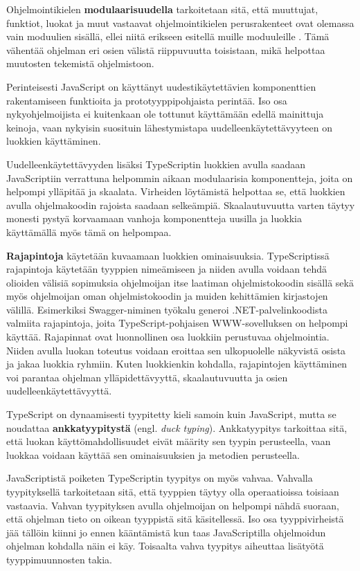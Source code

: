\documentclass[utf8]{gradu3}
\begin{document}
Ohjelmointikielen \textbf{modulaarisuudella} tarkoitetaan sitä, että muuttujat, funktiot, luokat ja muut vastaavat ohjelmointikielen perusrakenteet ovat olemassa vain moduulien sisällä, ellei niitä erikseen esitellä muille moduuleille \parencite[]{typescript-modules}. Tämä vähentää ohjelman eri osien välistä riippuvuutta toisistaan, mikä helpottaa muutosten tekemistä ohjelmistoon.

Perinteisesti JavaScript on käyttänyt uudestikäytettävien komponenttien rakentamiseen funktioita ja prototyyppipohjaista perintää. Iso osa nykyohjelmoijista ei kuitenkaan ole tottunut käyttämään edellä mainittuja keinoja, vaan nykyisin suosituin lähestymistapa uudelleenkäytettävyyteen on luokkien käyttäminen. \parencite[]{typescript-classes}

Uudelleenkäytettävyyden lisäksi TypeScriptin luokkien avulla saadaan JavaScriptiin verrattuna helpommin aikaan modulaarisia komponentteja, joita on helpompi ylläpitää ja skaalata. Virheiden löytämistä helpottaa se, että luokkien avulla ohjelmakoodin rajoista saadaan selkeämpiä. Skaalautuvuutta varten täytyy monesti pystyä korvaamaan vanhoja komponentteja uusilla ja luokkia käyttämällä myös tämä on helpompaa.

\textbf{Rajapintoja} käytetään kuvaamaan luokkien ominaisuuksia. TypeScriptissä rajapintoja käytetään tyyppien nimeämiseen ja niiden avulla voidaan tehdä olioiden välisiä sopimuksia ohjelmoijan itse laatiman ohjelmistokoodin sisällä sekä myös ohjelmoijan oman ohjelmistokoodin ja muiden kehittämien kirjastojen välillä. \parencite[]{typescript-interfaces} Esimerkiksi Swagger-niminen työkalu generoi .NET-palvelinkoodista valmiita rajapintoja, joita TypeScript-pohjaisen WWW-sovelluksen on helpompi käyttää. Rajapinnat ovat luonnollinen osa luokkiin perustuvaa ohjelmointia. Niiden avulla luokan toteutus voidaan eroittaa sen ulkopuolelle näkyvistä osista ja jakaa luokkia ryhmiin. Kuten luokkienkin kohdalla, rajapintojen käyttäminen voi parantaa ohjelman ylläpidettävyyttä, skaalautuvuutta ja osien uudelleenkäytettävyyttä.

TypeScript on dynaamisesti tyypitetty kieli samoin kuin JavaScript, mutta se noudattaa \textbf{ankkatyypitystä} (engl. \textit{duck typing}). Ankkatyypitys tarkoittaa sitä, että luokan käyttömahdollisuudet eivät määrity sen tyypin perusteella, vaan luokkaa voidaan käyttää sen ominaisuuksien ja metodien perusteella.

JavaScriptistä poiketen TypeScriptin tyypitys on myös vahvaa. Vahvalla tyypityksellä tarkoitetaan sitä, että tyyppien täytyy olla operaatioissa toisiaan vastaavia. Vahvan tyypityksen avulla ohjelmoijan on helpompi nähdä suoraan, että ohjelman tieto on oikean tyyppistä sitä käsitellessä. Iso osa tyyppivirheistä jää tällöin kiinni jo ennen kääntämistä kun taas JavaScriptilla ohjelmoidun ohjelman kohdalla näin ei käy. Toisaalta vahva tyypitys aiheuttaa lisätyötä tyyppimuunnosten takia.
\end{document}
